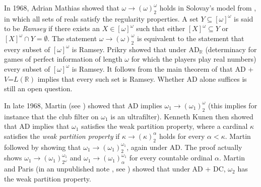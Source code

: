\documentclass{book}%
\begin{document}
In 1968, Adrian Mathias  showed that $\omega \to
(\omega)^{\omega}_{2}$ holds in Solovay's model from
, in which all sets of reals satisfy the regularity properties. A set $Y \subseteq [\omega]^{\omega}$ is
said to be \emph{Ramsey} if there exists an $X \in
[\omega]^{\omega}$ such that either $[X]^{\omega} \subseteq Y$ or
$[X]^{\omega} \cap Y = \emptyset$. The statement $\omega \to
(\omega)^{\omega}_{2}$ is equivalent to the statement that every
subset of $[\omega]^{\omega}$ is Ramsey.
Prikry  showed that under AD$_{\mathbb{R}}$
(determinacy for games of perfect information of length $\omega$ for
which the players play real numbers) every subset of $[\omega]^{\omega}$ is Ramsey.
It follows from the main theorem of \cite{MartinSteel:1983} that AD + $V\mathord{=}L(\mathbb{R})$ implies that every such set is Ramsey.
Whether AD alone suffices is still an open question.

In late 1968, Martin (see \cite[p.~392]{Kanamori}) showed that AD implies $\omega_{1} \to
(\omega_{1})^{\omega}_{2}$ (this implies for instance that the club filter on $\omega_{1}$ is an ultrafilter). Kenneth Kunen then showed that AD
implies that $\omega_{1}$ satisfies the weak partition
property, where a cardinal $\kappa$ satisfies the \emph{weak
partition property} if $\kappa \to (\kappa)^{\alpha}_{2}$ holds for
every $\alpha < \kappa$. Martin followed by showing that $\omega_{1} \to (\omega_{1})^{\omega_{1}}_{2}$, again under AD.
The proof actually shows $\omega_{1}
\to (\omega_{1})^{\omega_{1}}_{2^{\omega}}$ and $\omega_{1} \to
(\omega_{1})^{\omega_{1}}_{\alpha}$ for every countable ordinal
$\alpha$.
Martin and Paris (in an unpublished note
, see \cite{Kechris:1978}) showed that under AD + DC,
$\omega_{2}$ has the weak partition property.
\end{document}
